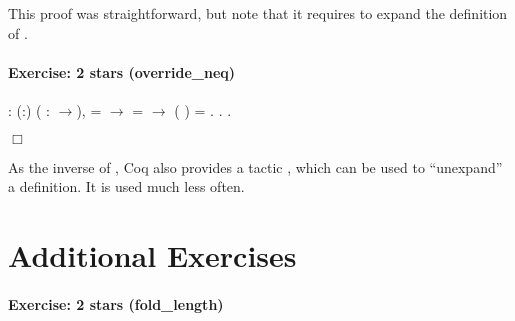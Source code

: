 \documentclass[12pt]{report}
\begin{document}
This proof was straightforward, but note that it requires
     to expand the definition of . 

\paragraph{Exercise: 2 stars (override\_neq)}

\begin{coqdoccode}
\coqdocnoindent
{}  : \coqdockw{\ensuremath{\forall}} (:)     ( : \ensuremath{\rightarrow}),\coqdoceol
\coqdocindent{1.00em}
  =  \ensuremath{\rightarrow}\coqdoceol
\coqdocindent{1.00em}
   =  \ensuremath{\rightarrow}\coqdoceol
\coqdocindent{1.00em}
(   )  = .\coqdoceol
\coqdocnoindent
{}.\coqdoceol
 .\coqdoceol
\end{coqdoccode}
\ensuremath{\Box} 

 As the inverse of , Coq also provides a tactic
    , which can be used to ``unexpand'' a definition.  It is used
    much less often. \begin{coqdoccode}
\coqdocemptyline
\end{coqdoccode}
\section{Additional Exercises}



\paragraph{Exercise: 2 stars (fold\_length)}
\end{document}

